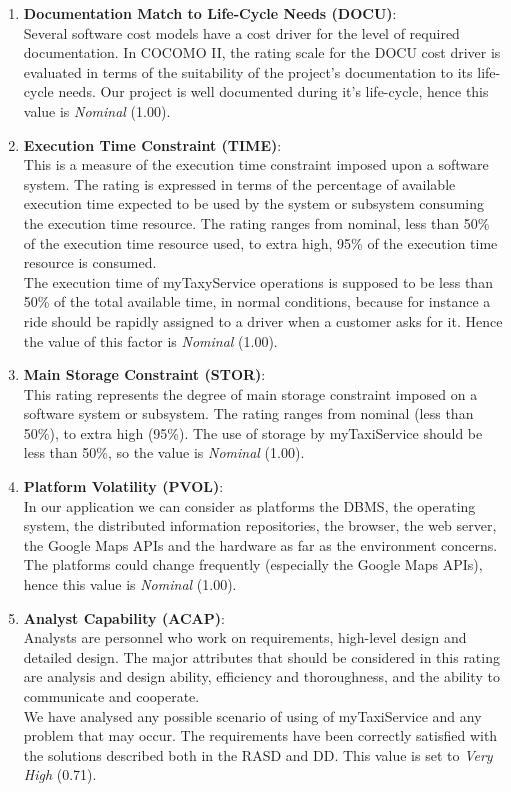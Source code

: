 \documentclass[\mainpath/main]{subfiles}
\begin{document}
\begin{enumerate}
	\item \textbf{Documentation Match to Life-Cycle Needs (DOCU)}:\\
	Several software cost models have a cost driver for the level of required documentation.	In COCOMO II, the rating scale for the DOCU cost driver is evaluated in terms of the suitability of the project's documentation to its life-cycle needs. Our project is well documented during it's life-cycle, hence this value is \textit{Nominal} (1.00).
	
	\item \textbf{Execution Time Constraint (TIME)}:\\
	This is a measure of the execution time constraint imposed upon a software system. The rating is expressed in terms of the percentage of available execution time expected to be used by the system or subsystem consuming the execution time resource. The rating ranges from nominal, less than 50\% of the execution time resource used, to extra high, 95\% of the execution time resource is consumed.\\
	The execution time of myTaxyService operations is supposed to be less than 50\% of the total available time, in normal conditions, because for instance a ride should be rapidly assigned to a driver when a customer asks for it. Hence the value of this factor is \textit{Nominal} (1.00).
	
	\item \textbf{Main Storage Constraint (STOR)}:\\
	This rating represents the degree of main storage constraint imposed on a software system or subsystem. The rating	ranges from nominal (less than 50\%), to extra high (95\%). The use of storage by myTaxiService should be less than 50\%, so the value is \textit{Nominal} (1.00).
	
	\item \textbf{Platform Volatility (PVOL)}:\\
	In our application we can consider as platforms the DBMS, the operating system, the distributed information repositories, the browser, the web server, the Google Maps APIs and the hardware as far as the environment concerns. The platforms could change frequently (especially the Google Maps APIs), hence this value is \textit{Nominal} (1.00).
	
	\item \textbf{Analyst Capability (ACAP)}:\\
	Analysts are personnel who work on requirements, high-level design and detailed design. The major attributes that should be considered in this rating are analysis and design ability, efficiency and thoroughness, and the ability to communicate and cooperate.\\
	We have analysed any possible scenario of using of myTaxiService and any problem that may occur. The requirements have been correctly satisfied with the solutions described both in the RASD and DD. This value is set to \textit{Very High} (0.71).
	

\end{enumerate}
\end{document}
